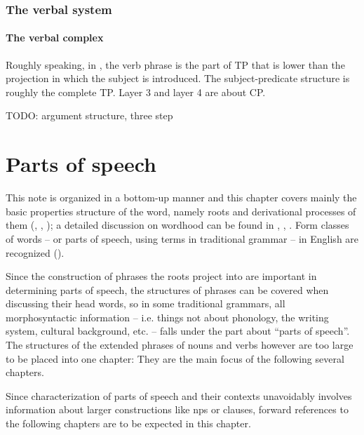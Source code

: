 \documentclass[UTF8, a4paper, oneside, scheme=plain, 12pt]{ctexbook}
\begin{document}
{\subsection{The verbal system}

\subsubsection{The verbal complex}\label{sec:vp-tp-cp}

Roughly speaking, in ,
the verb phrase is the part of TP that is lower than the projection in which the subject is introduced.
The subject-predicate structure is roughly the complete TP.
Layer 3 and layer 4 are about CP.

TODO: argument structure, three step

}

\chapter{Parts of speech}


This note is organized in a bottom-up manner and 
this chapter covers mainly the basic properties structure of the word,
namely roots and derivational processes of them
(,
,
);
a detailed discussion on wordhood can be found in 
,
,
.
Form classes of words -- or parts of speech, using terms in traditional grammar -- in English
are recognized ().

Since the construction of phrases the roots project into are important
in determining parts of speech, 
the structures of phrases can be covered when discussing their head words,
so in some traditional grammars,
all morphosyntactic information 
-- i.e. things not about phonology, the writing system, cultural background, etc. -- 
falls under the part about ``parts of speech''.
The structures of the extended phrases of nouns and verbs however are too large 
to be placed into one chapter:
They are the main focus of the following several chapters.

Since characterization of parts of speech and their contexts unavoidably involves 
information about larger constructions like \acs{np}s or clauses,
forward references to the following chapters are to be expected in this chapter.
\end{document}
